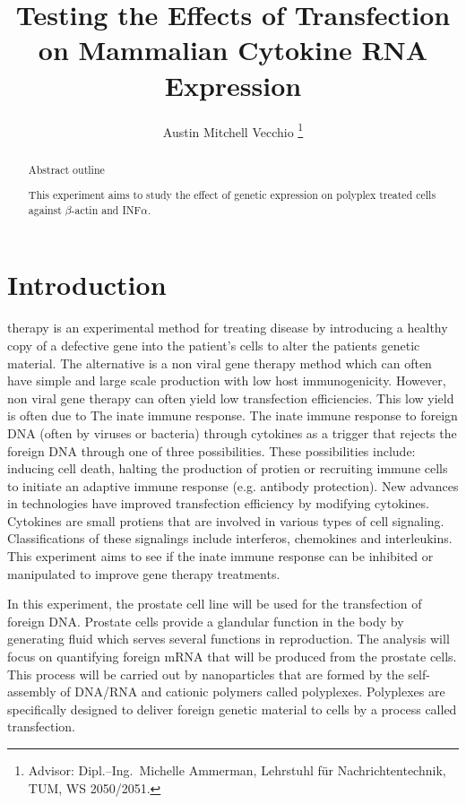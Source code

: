 \documentclass[journal, a4paper]{IEEEtran}
\begin{document}
\title{Testing the Effects of Transfection on Mammalian Cytokine RNA Expression}
\author{Austin Mitchell Vecchio
\thanks{Advisor: Dipl.--Ing.~Michelle Ammerman, Lehrstuhl f\"ur Nachrichtentechnik, TUM, WS 2050/2051.}}
\maketitle

\begin{abstract}
  Abstract outline

  This experiment aims to study the effect of genetic expression on polyplex treated cells against $\beta$-actin and INF$\alpha$.

\end{abstract}

\section{Introduction}
   therapy is an experimental method for treating disease by introducing a healthy copy of a
  defective gene into the patient's cells to alter the patients genetic material.
  The alternative is a non viral gene therapy method which can often have simple and large scale production
  with low host immunogenicity. However, non viral gene therapy can often yield low transfection efficiencies.
  This low yield is often due to The inate immune response. The inate immune response to foreign DNA (often by viruses or bacteria) through cytokines
  as a trigger that rejects the foreign DNA through one of three possibilities. These possibilities include: inducing
  cell death, halting the production of protien or recruiting immune cells to initiate an adaptive immune response (e.g. antibody protection).
  New advances in technologies have improved transfection efficiency by modifying cytokines. Cytokines
  are small protiens that are involved in various types of cell signaling. Classifications of these signalings
  include interferos, chemokines and interleukins.
  This experiment aims to see if the inate immune response can be inhibited or manipulated to improve gene therapy treatments.

  In this experiment, the prostate cell line will be used for the transfection of foreign DNA. Prostate cells provide a glandular function
  in the body by generating fluid which serves several functions in reproduction. The analysis will focus on quantifying foreign mRNA that will be
  produced from the prostate cells. This process will be carried out by nanoparticles that are formed by the self-assembly of DNA/RNA and cationic polymers
  called polyplexes. Polyplexes are specifically designed to deliver foreign genetic material to cells by a process called transfection.
\end{document}
